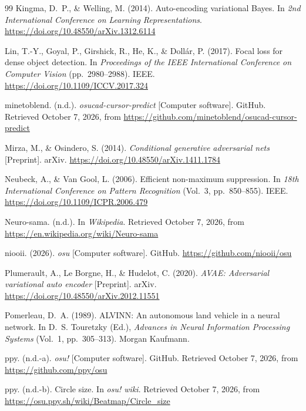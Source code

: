 \begin{thebibliography}{99}
Kingma, D.~P., \& Welling, M. (2014). Auto-encoding variational Bayes. In \emph{2nd International Conference on
Learning Representations}. \url{https://doi.org/10.48550/arXiv.1312.6114}

Lin, T.-Y., Goyal, P., Girshick, R., He, K., \& Doll\'ar, P. (2017). Focal loss for dense object detection. In
\emph{Proceedings of the IEEE International Conference on Computer Vision} (pp.~2980--2988). IEEE.
\url{https://doi.org/10.1109/ICCV.2017.324}

minetoblend. (n.d.). \emph{osucad-cursor-predict} [Computer software]. GitHub. Retrieved October 7, 2026, from
\url{https://github.com/minetoblend/osucad-cursor-predict}

Mirza, M., \& Osindero, S. (2014). \emph{Conditional generative adversarial nets} [Preprint]. arXiv.
\url{https://doi.org/10.48550/arXiv.1411.1784}

Neubeck, A., \& Van Gool, L. (2006). Efficient non-maximum suppression. In \emph{18th International Conference
on Pattern Recognition} (Vol.~3, pp.~850--855). IEEE. \url{https://doi.org/10.1109/ICPR.2006.479}

Neuro-sama. (n.d.). In \emph{Wikipedia}. Retrieved October 7, 2026, from
\url{https://en.wikipedia.org/wiki/Neuro-sama}

niooii. (2026). \emph{osu} [Computer software]. GitHub. \url{https://github.com/niooii/osu}

Plumerault, A., Le Borgne, H., \& Hudelot, C. (2020). \emph{AVAE: Adversarial variational auto encoder}
[Preprint]. arXiv. \url{https://doi.org/10.48550/arXiv.2012.11551}

Pomerleau, D.~A. (1989). ALVINN: An autonomous land vehicle in a neural network. In D.~S. Touretzky (Ed.),
\emph{Advances in Neural Information Processing Systems} (Vol.~1, pp.~305--313). Morgan Kaufmann.

ppy. (n.d.-a). \emph{osu!} [Computer software]. GitHub. Retrieved October 7, 2026, from
\url{https://github.com/ppy/osu}

ppy. (n.d.-b). Circle size. In \emph{osu! wiki}. Retrieved October 7, 2026, from
\url{https://osu.ppy.sh/wiki/Beatmap/Circle_size}


\end{thebibliography}
